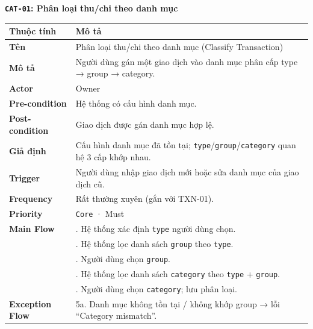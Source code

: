 \documentclass[11pt,a4paper]{article}
\newcounter{none}
\newcommand{\faintline}{\noalign{\global\arrayrulecolor{faintgray}}\hline\noalign{\global\arrayrulecolor{black}}} %
\begin{document}
\textbf{\texttt{CAT-01}: Phân loại thu/chi theo danh mục}

{\def\LTcaptype{none}
\begin{longtable}[]{@{}
  >{\raggedright\arraybackslash}p{}
  >{\raggedright\arraybackslash}p{}@{}}
\toprule\noalign{}
\begin{minipage}[b]{\linewidth}\raggedright
Thuộc tính
\end{minipage} & \begin{minipage}[b]{\linewidth}\raggedright
Mô tả
\end{minipage} \\
\midrule\noalign{}
\endhead
\bottomrule\noalign{}
\endlastfoot
\textbf{Tên} & Phân loại thu/chi theo danh mục (Classify Transaction) \\ \faintline
\textbf{Mô tả} & Người dùng gán một giao dịch vào danh mục phân cấp type → group → category. \\ \faintline
\textbf{Actor} & Owner \\ \faintline
\textbf{Pre-condition} & Hệ thống có cấu hình danh mục. \\ \faintline
\textbf{Post-condition} & Giao dịch được gán danh mục hợp lệ. \\ \faintline
\textbf{Giả định} & Cấu hình danh mục đã tồn tại; \texttt{type}/\texttt{group}/\texttt{category} quan hệ 3 cấp khớp nhau. \\ \faintline
\textbf{Trigger} & Người dùng nhập giao dịch mới hoặc sửa danh mục của giao dịch cũ. \\ \faintline
\textbf{Frequency} & Rất thường xuyên (gắn với TXN-01). \\ \faintline
\textbf{Priority} & \texttt{Core} · Must \\ \faintline
\textbf{Main Flow} & 1. Hệ thống xác định \texttt{type} người dùng chọn.\\
&2. Hệ thống lọc danh sách \texttt{group} theo \texttt{type}.\\
&3. Người dùng chọn \texttt{group}.\\
&4. Hệ thống lọc danh sách \texttt{category} theo \texttt{type} + \texttt{group}.\\
&5. Người dùng chọn \texttt{category}; lưu phân loại. \\ \faintline
\textbf{Exception Flow} & 5a. Danh mục không tồn tại / không khớp group → lỗi ``Category mismatch''. \\
\end{longtable}
}
\end{document}
